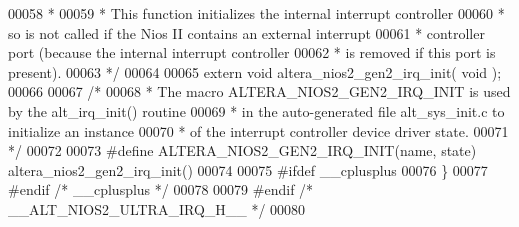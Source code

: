 \begin{DoxyCode}
00058 \textcolor{comment}{ *}
00059 \textcolor{comment}{ * This function initializes the internal interrupt controller}
00060 \textcolor{comment}{ * so is not called if the Nios II contains an external interrupt}
00061 \textcolor{comment}{ * controller port (because the internal interrupt controller}
00062 \textcolor{comment}{ * is removed if this port is present).}
00063 \textcolor{comment}{ */}
00064 
00065 \textcolor{keyword}{extern} \textcolor{keywordtype}{void} altera_nios2_gen2_irq_init( \textcolor{keywordtype}{void} );
00066 
00067 \textcolor{comment}{/*}
00068 \textcolor{comment}{ * The macro ALTERA\_NIOS2\_GEN2\_IRQ\_INIT is used by the alt\_irq\_init() routine}
00069 \textcolor{comment}{ * in the auto-generated file alt\_sys\_init.c to initialize an instance}
00070 \textcolor{comment}{ * of the interrupt controller device driver state.}
00071 \textcolor{comment}{ */}
00072 
00073 \textcolor{preprocessor}{#define ALTERA\_NIOS2\_GEN2\_IRQ\_INIT(name, state) altera\_nios2\_gen2\_irq\_init()}
00074 
00075 \textcolor{preprocessor}{#ifdef \_\_cplusplus}
00076 \}
00077 \textcolor{preprocessor}{#endif }\textcolor{comment}{/* \_\_cplusplus */}\textcolor{preprocessor}{}
00078 
00079 \textcolor{preprocessor}{#endif }\textcolor{comment}{/* \_\_ALT\_NIOS2\_ULTRA\_IRQ\_H\_\_ */}\textcolor{preprocessor}{}
00080 
\end{DoxyCode}
